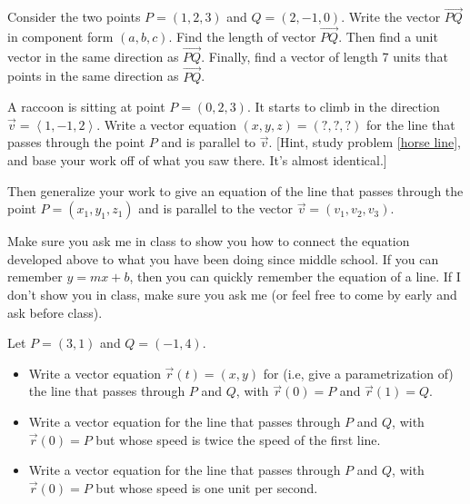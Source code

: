 \begin{problem}
Consider the two points $P=(1,2,3)$ and $Q=(2,-1,0)$. Write the vector $\vec {PQ}$ in component form $(a,b,c)$. Find the length of vector $\vec {PQ}$. Then find a unit vector in the same direction as $\vec{PQ}$. Finally, find a vector of length 7 units that points in the same direction as $\vec{PQ}$. 
\end{problem}


\begin{problem}
A raccoon is sitting at point $P=(0,2,3)$.  It starts to climb in the direction $\vec v=\left<1,-1,2\right>$.  
Write a vector equation $(x,y,z)=(?,?,?)$ for the line that passes through the point $P$ and is parallel to $\vec v$. [Hint, study problem \ref{horse line}, and base your work off of what you saw there. It's almost identical.]

Then generalize your work to give an equation of the line that passes through the point $P=(x_1,y_1,z_1)$ and is parallel to the vector $\vec v=(v_1,v_2,v_3)$. 
\end{problem}

Make sure you ask me in class to show you how to connect the equation developed above to what you have been doing since middle school. If you can remember $y=mx+b$, then you can quickly remember the equation of a line.  If I don't show you in class, make sure you ask me (or feel free to come by early and ask before class).

\begin{problem}\label{first line between two points}%
Let $P=(3,1)$ and $Q=(-1,4)$.  
\begin{itemize}
\item Write a vector equation $\vec r(t)=(x,y)$ for (i.e, give a parametrization of) the line that passes through $P$ and $Q$, with $\vec r(0)=P$ and $\vec r(1)=Q$.
\item Write a vector equation for the line that passes through $P$ and $Q$, with $\vec r(0)=P$ but whose speed is twice the speed of the first line.
\item Write a vector equation for the line that passes through $P$ and $Q$, with $\vec r(0)=P$ but whose speed is one unit per second.
\end{itemize}
\end{problem}

